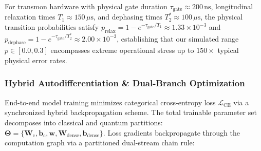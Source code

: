 \documentclass[journal]{IEEEtran}
\begin{document}
For transmon hardware with physical gate duration $\tau_{\mathrm{gate}} \approx 200\,\mathrm{ns}$, longitudinal relaxation times $T_1 \approx 150\,\mu\mathrm{s}$, and dephasing times $T_2^* \approx 100\,\mu\mathrm{s}$, the physical transition probabilities satisfy $p_{\mathrm{relax}} = 1 - e^{-\tau_{\mathrm{gate}}/T_1} \approx 1.33 \times 10^{-3}$ and $p_{\mathrm{dephase}} = 1 - e^{-\tau_{\mathrm{gate}}/T_2^*} \approx 2.00 \times 10^{-3}$, establishing that our simulated range $p \in [0.0, 0.3]$ encompasses extreme operational stress up to $150\times$ typical physical error rates.

\subsubsection{Hybrid Autodifferentiation \& Dual-Branch Optimization}
End-to-end model training minimizes categorical cross-entropy loss $\mathcal{L}_{\mathrm{CE}}$ via a synchronized hybrid backpropagation scheme. The total trainable parameter set decomposes into classical and quantum partitions: $\boldsymbol{\Theta} = \{\mathbf{W}_{\mathrm{c}}, \mathbf{b}_{\mathrm{c}}, \mathbf{w}, \mathbf{W}_{\mathrm{dense}}, \mathbf{b}_{\mathrm{dense}}\}$. Loss gradients backpropagate through the computation graph via a partitioned dual-stream chain rule:
\end{document}
